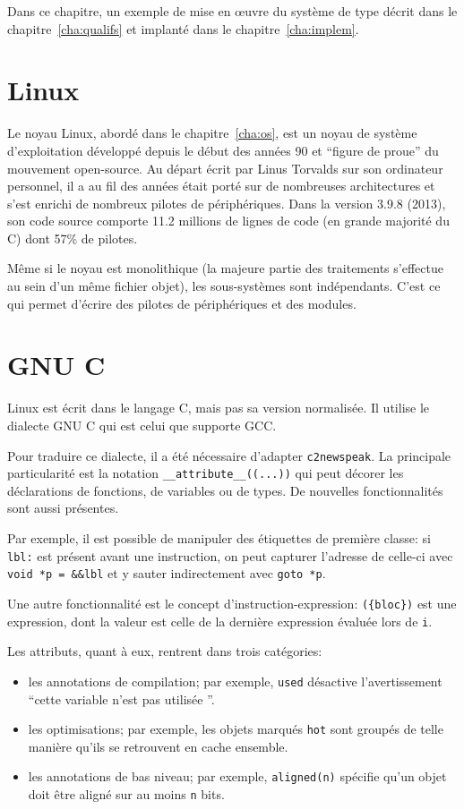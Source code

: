 Dans ce chapitre, un exemple de mise en œuvre du système de type décrit dans le
chapitre~\ref{cha:qualifs} et implanté dans le chapitre~\ref{cha:implem}.

\section{Linux}

Le noyau Linux, abordé dans le chapitre~\ref{cha:os}, est un noyau de système
d'exploitation développé depuis le début des années 90 et ``figure de proue'' du
mouvement open-source. Au départ écrit par Linus Torvalds sur son ordinateur
personnel, il a au fil des années était porté sur de nombreuses architectures et
s'est enrichi de nombreux pilotes de périphériques. Dans la version 3.9.8
(2013), son code source comporte 11.2 millions de lignes de code (en grande
majorité du C) dont 57\% de pilotes.

Même si le noyau est monolithique (la majeure partie des traitements s'effectue
au sein d'un même fichier objet), les sous-systèmes sont indépendants. C'est ce
qui permet d'écrire des pilotes de périphériques et des modules.

\section{GNU C}

Linux est écrit dans le langage C, mais pas sa version normalisée. Il utilise le
dialecte GNU C qui est celui que supporte GCC.\@

Pour traduire ce dialecte, il a été nécessaire d'adapter \texttt{c2newspeak}. La
principale particularité est la notation \verb!__attribute__((...))! qui peut
décorer les déclarations de fonctions, de variables ou de types. De nouvelles
fonctionnalités sont aussi présentes.

Par exemple, il est possible de manipuler des étiquettes de première classe: si
\texttt{lbl:} est présent avant une instruction, on peut capturer l'adresse de
celle-ci avec \texttt{void *p = \&\&lbl} et y sauter indirectement avec
\texttt{goto *p}.

Une autre fonctionnalité est le concept d'instruction-expression:
\texttt{(\{bloc\})} est une expression, dont la valeur est celle de la dernière
expression évaluée lors de \texttt{i}.

Les attributs, quant à eux, rentrent dans trois catégories:

\begin{itemize}
  \item les annotations de compilation; par exemple, \texttt{used} désactive
    l'avertissement ``cette variable n'est pas utilisée ''.

  \item les optimisations; par exemple, les objets marqués \texttt{hot} sont
    groupés de telle manière qu'ils se retrouvent en cache ensemble.

  \item les annotations de bas niveau; par exemple, \verb!aligned(n)!
    spécifie qu'un objet doit être aligné sur au moins \texttt{n} bits.
\end{itemize}

